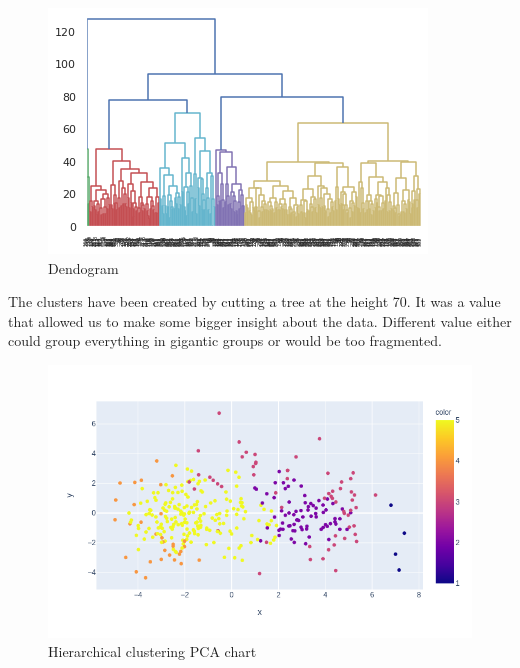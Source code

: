 \documentclass[sigconf]{acmart}
\begin{document}
    \begin{figure}[h]
        \includegraphics[width=\linewidth]{dendogram-70.png}
        \centering
        \caption{Dendogram}
    \end{figure}
    
     The clusters have been created by cutting a tree at the height 70. It was a value that allowed us to make some bigger insight about the data. Different value either could group everything in gigantic groups or would be too fragmented.
     
    \begin{figure}[h]
        \includegraphics[width=\linewidth]{hierarchical.png}
        \centering
        \caption{Hierarchical clustering PCA chart}
    \end{figure}
    
\end{document}
